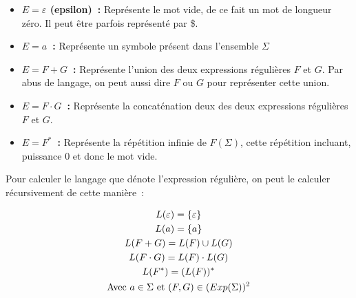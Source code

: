 \vphantom{}

\begin{itemize}
    \item[\textbullet] \textbf{\(E = \varepsilon\) (epsilon)~:}
        Représente le mot vide, de ce fait un mot de longueur zéro. Il peut être
        parfois représenté par \og{}\$\fg{}.

        \vphantom{}

    \item[\textbullet] \textbf{\(E = a\)~:} Représente un symbole
        présent dans l'ensemble \(\Sigma\)

        \vphantom{}

    \item[\textbullet] \textbf{\(E = F + G\)~:} Représente l'union
        des deux expressions régulières \(F\) et \(G\). Par abus de langage, on
        peut aussi dire \(F\) \og{}ou\fg{} \(G\) pour représenter cette union.

        \vphantom{}

    \item[\textbullet] \textbf{\(E = F \cdot G\)~:}
        Représente la concaténation deux des deux expressions régulières
        \(F\) et \(G\).

        \vphantom{}

    \item[\textbullet] \textbf{\(E = F^* \)~:} Représente la
        répétition infinie de \(F(\Sigma)\), cette répétition incluant,
        puissance \(0\) et donc le mot vide.
\end{itemize}

\vphantom{}

Pour calculer le langage que dénote l'expression régulière, on peut le calculer
récursivement de cette manière~:

\begin{gather}
    L(\varepsilon) = \{\varepsilon\} \\
    L(a) = \{a\} \\
    L(F + G) = L(F) \cup L(G) \\
    L(F \cdot G) = L(F) \cdot L(G) \\
    L(F^*) = (L(F))^* \\
    \text{Avec } a \in \Sigma \text{ et } (F, G) \in (Exp(\Sigma))^2 \notag
\end{gather}

